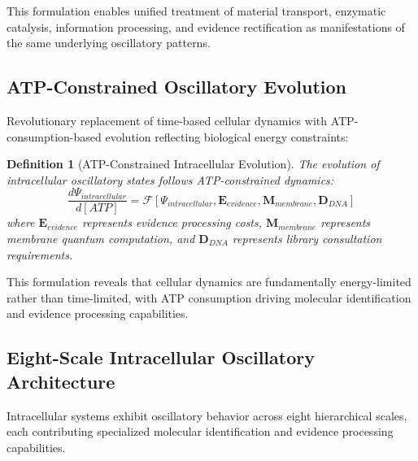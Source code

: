 \documentclass[12pt,a4paper]{article}
\newtheorem{definition}{Definition}
\begin{document}
This formulation enables unified treatment of material transport, enzymatic catalysis, information processing, and evidence rectification as manifestations of the same underlying oscillatory patterns.

\subsection{ATP-Constrained Oscillatory Evolution}

Revolutionary replacement of time-based cellular dynamics with ATP-consumption-based evolution reflecting biological energy constraints:

\begin{definition}[ATP-Constrained Intracellular Evolution]
The evolution of intracellular oscillatory states follows ATP-constrained dynamics:
\begin{equation}
\frac{d\Psi_{intracellular}}{d[ATP]} = \mathcal{F}[\Psi_{intracellular}, \mathbf{E}_{evidence}, \mathbf{M}_{membrane}, \mathbf{D}_{DNA}]
\end{equation}
where $\mathbf{E}_{evidence}$ represents evidence processing costs, $\mathbf{M}_{membrane}$ represents membrane quantum computation, and $\mathbf{D}_{DNA}$ represents library consultation requirements.
\end{definition}

This formulation reveals that cellular dynamics are fundamentally energy-limited rather than time-limited, with ATP consumption driving molecular identification and evidence processing capabilities.

\subsection{Eight-Scale Intracellular Oscillatory Architecture}

Intracellular systems exhibit oscillatory behavior across eight hierarchical scales, each contributing specialized molecular identification and evidence processing capabilities.
\end{document}
